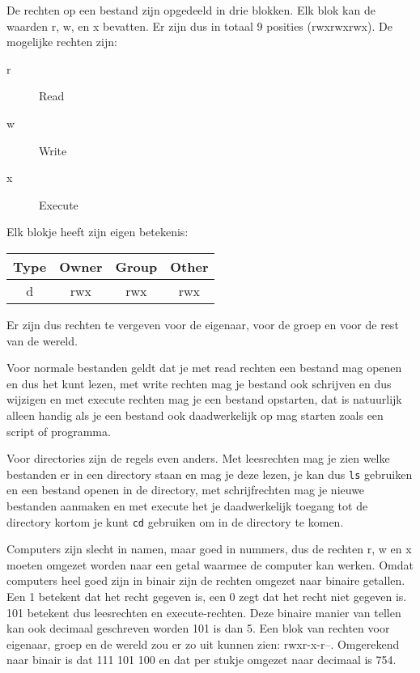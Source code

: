 De rechten op een bestand zijn opgedeeld in drie blokken. Elk blok kan de waarden r, w, en x bevatten. Er zijn dus in totaal 9 posities (rwxrwxrwx). De mogelijke rechten zijn:
\begin{description}
\item[r] Read
\item[w] Write
\item[x] Execute
\end{description}
Elk blokje heeft zijn eigen betekenis:
\begin{tabular}{ | c | c | c | c | }
\hline
Type & Owner & Group & Other \\
\hline
d & rwx & rwx & rwx \\
\hline
\end{tabular}
Er zijn dus rechten te vergeven voor de eigenaar, voor de groep en voor de rest van de wereld.

Voor normale bestanden geldt dat je met read rechten een bestand mag openen en dus het kunt lezen, met write rechten mag je bestand ook schrijven en dus wijzigen en met execute rechten mag je een bestand opstarten, dat is natuurlijk alleen handig als je een bestand ook daadwerkelijk op mag starten zoals een script of programma.

Voor directories zijn de regels even anders. Met leesrechten mag je zien welke bestanden er in een directory staan en mag je deze lezen, je kan dus \texttt{ls} gebruiken en een bestand openen in de directory, met schrijfrechten mag je nieuwe bestanden aanmaken en met execute het je daadwerkelijk toegang tot de directory kortom je kunt \texttt{cd} gebruiken om in de directory te komen.

Computers zijn slecht in namen, maar goed in nummers, dus de rechten r, w en x moeten omgezet worden naar een getal waarmee de computer kan werken. Omdat computers heel goed zijn in binair zijn de rechten omgezet naar binaire getallen. Een 1 betekent dat het recht gegeven is, een 0 zegt dat het recht niet gegeven is. 101 betekent dus leesrechten en execute-rechten. Deze binaire manier van tellen kan ook decimaal geschreven worden 101 is dan 5. Een blok van rechten voor eigenaar, groep en de wereld zou er zo uit kunnen zien: rwxr-x-r--. Omgerekend naar binair is dat 111 101 100 en dat per stukje omgezet naar decimaal is 754.

